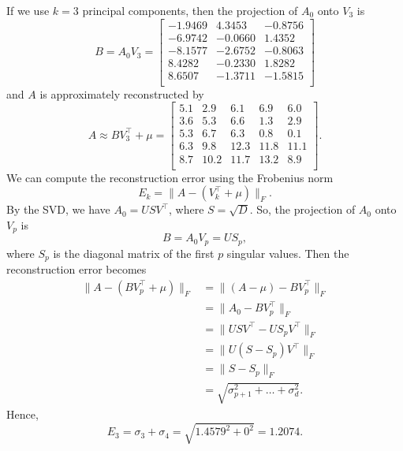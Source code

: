 If we use \(k = 3\) principal components, then the projection of \(A_0\) onto \(V_3\) is
\begin{equation}B = A_0 V_3 = \begin{bmatrix}
    -1.9469 &  4.3453 & -0.8756 \\
    -6.9742 & -0.0660 &  1.4352 \\
    -8.1577 & -2.6752 & -0.8063 \\
        8.4282 & -0.2330 &  1.8282 \\
        8.6507 & -1.3711 & -1.5815 \\
\end{bmatrix}\end{equation}
and \(A\) is approximately reconstructed by
\begin{equation}A \approx B V_3^\top + \mu = \begin{bmatrix}
    5.1 &  2.9 &  6.1 &  6.9 &  6.0 \\
    3.6 &  5.3 &  6.6 &  1.3 &  2.9 \\
    5.3 &  6.7 &  6.3 &  0.8 &  0.1 \\
    6.3 &  9.8 & 12.3 & 11.8 & 11.1 \\
    8.7 & 10.2 & 11.7 & 13.2 &  8.9 \\
\end{bmatrix}.\end{equation}
We can compute the reconstruction error using the Frobenius norm
\begin{equation*}%
    E_k = \|A - (V_k^\top + \mu)\|_F.
\end{equation*}
By the SVD, we have \(A_0 = USV^\top\), where \(S = \sqrt{D}\).
So, the projection of \(A_0\) onto \(V_p\) is \begin{equation}B = A_0 V_p = U S_p,\end{equation} where \(S_p\) is the diagonal matrix of the first \(p\) singular values.
Then the reconstruction error becomes
\begin{align*}
    \|A - (BV_p^\top + \mu)\|_F
    &= \|(A - \mu) - BV_p^\top\|_F \\
    &= \|A_0 - BV_p^\top\|_F \\
    &= \|USV^\top - US_pV^\top\|_F \\
    &= \|U(S - S_p)V^\top\|_F \\
    &= \|S-S_p\|_F \\
    &= \sqrt{\sigma_{p+1}^2 + \dots + \sigma_{d}^2}.
\end{align*}
Hence,
\begin{equation}E_3 = \sigma_3 + \sigma_4 = \sqrt{1.4579^2 + 0^2} = 1.2074.\end{equation}